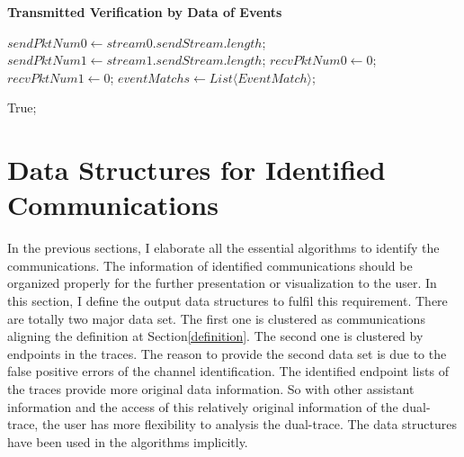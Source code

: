 \begin{algorithm}[H]
\DontPrintSemicolon
\caption{{\bf Transmitted Verification by Data of Events } \label{dataAlg2}}
$sendPktNum0 \leftarrow stream0.sendStream.length$;\;
$sendPktNum1 \leftarrow stream1.sendStream.length$;\;
$recvPktNum0 \leftarrow 0$;\;
$recvPktNum1 \leftarrow 0$;\;
$eventMatchs \leftarrow List \langle EventMatch \rangle$;\;



 \KwRet True;\;
\end{algorithm}



\section{Data Structures for Identified Communications}
In the previous sections, I elaborate all the essential algorithms to identify the communications. The information of identified communications should be organized properly for the further presentation or visualization to the user. In this section, I define the output data structures to fulfil this requirement. There are totally two major data set. The first one is clustered as communications aligning the definition at Section\ref{definition}. The second one is clustered by endpoints in the traces. The reason to provide the second data set is due to the false positive errors of the channel identification. The identified endpoint lists of the traces provide more original data information. So with other assistant information and the access of this relatively original information of the dual-trace, the user has more flexibility to analysis the dual-trace. The data structures have been used in the algorithms implicitly.

